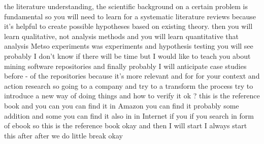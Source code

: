 \documentclass[conference, compsoc, twoside]{IEEEtran}
\begin{document}
the literature understanding, the scientific background on a certain problem is fundamental so you will need to learn for a systematic literature reviews because it's helpful to create possible hypotheses based on existing theory.
then you will learn qualitative, not analysis methods and you will learn quantitative that analysis Metso experiments was experiments and hypothesis testing you will see probably I don't know if there will be time but I would like to teach you about mining software repositories and finally probably I will anticipate case studies before - of the repositories because it's more relevant and for for your context and action research so going to a company and try to a transform the process try to introduce a new way of doing things and how to verify it ok ? this is the reference book and you can you can find it in Amazon you can find it probably some addition and some you can find it also in in Internet if you if you search in form of ebook so this is the reference book okay and then I will start I always start this after after we do little break okay 


\end{document}
